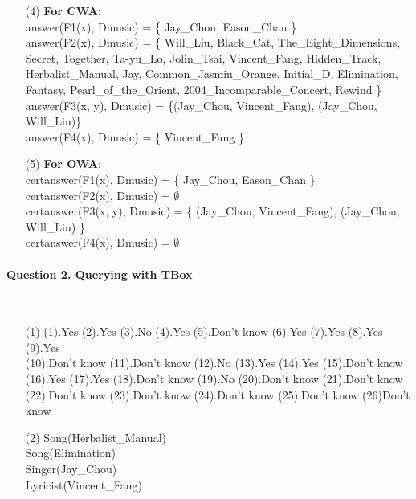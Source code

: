 \documentclass[12pt]{article}
\begin{document}
\begin{enumerate}
        (11).Don't know \\
        (12).Don't know (13).Don't know (14).Yes (15).Don't know (16).Don't know \\
        (17).Yes (18).Don't know (19).Don't know (20).Don't know (21).  Don't know \\
        (22).Don't know (23).Don't know (24).Don't know (25).Don't know(26)Don't know
        \item [(4)]
        \textbf{For CWA}: \\
        answer(F1(x), Dmusic) = \{ Jay\_Chou, Eason\_Chan \} \\
        answer(F2(x), Dmusic) = \{ Will\_Liu, Black\_Cat, The\_Eight\_Dimensions, Secret, Together, Ta-yu\_Lo, Jolin\_Tsai, Vincent\_Fang, Hidden\_Track, Herbalist\_Manual, Jay, Common\_Jasmin\_Orange, Initial\_D, Elimination, Fantasy, Pearl\_of\_the\_Orient, 2004\_Incomparable\_Concert, Rewind \} \\
        answer(F3(x, y), Dmusic) = \{(Jay\_Chou, Vincent\_Fang), (Jay\_Chou, Will\_Liu)\} \\
        answer(F4(x), Dmusic) = \{ Vincent\_Fang \}
        \item[(5)]
        \textbf{For OWA}: \\
        certanswer(F1(x), Dmusic) = \{ Jay\_Chou, Eason\_Chan \} \\
        certanswer(F2(x), Dmusic) = $\emptyset$ \\
        certanswer(F3(x, y), Dmusic) = \{ (Jay\_Chou, Vincent\_Fang), (Jay\_Chou, Will\_Liu) \} \\
        certanswer(F4(x), Dmusic) = $\emptyset$
    \end{enumerate}


    \newpage
    \paragraph{Question 2. Querying with TBox}~{}
    \\

	\begin{enumerate}
        \item [(1)]
        (1).Yes (2).Yes (3).No (4).Yes (5).Don't know (6).Yes (7).Yes (8).Yes (9).Yes \\
        (10).Don't know (11).Don't know (12).No (13).Yes (14).Yes (15).Don't know \\
        (16).Yes (17).Yes (18).Don't know (19).No (20).Don't know (21).Don't know \\
        (22).Don't know (23).Don't know (24).Don't know (25).Don't know
        (26)Don't know
        \item [(2)]
        Song(Herbalist\_Manual) \\
        Song(Elimination) \\
        Singer(Jay\_Chou) \\
        Lyricist(Vincent\_Fang) \\
    \end{enumerate}
\end{document}
